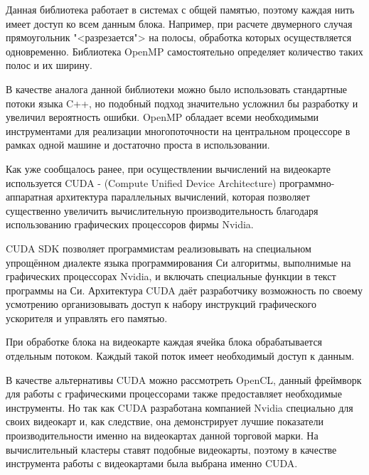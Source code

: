 \documentclass[a4paper, 14pt]{article}
\theoremstyle{definition}
\begin{document}
\par Данная библиотека работает в системах с общей памятью, поэтому каждая нить имеет доступ ко всем данным блока. Например, при расчете двумерного случая прямоугольник "<разрезается"> на полосы, обработка которых осуществляется одновременно. Библиотека OpenMP самостоятельно определяет количество таких полос и их ширину.

\par В качестве аналога данной библиотеки можно было использовать стандартные потоки языка C++, но подобный подход значительно усложнил бы разработку и увеличил вероятность ошибки. OpenMP обладает всеми необходимыми инструментами для реализации многопоточности на центральном процессоре в рамках одной машине и достаточно проста в использовании.


\par Как уже сообщалось ранее, при осуществлении вычислений на видеокарте используется CUDA - (Compute Unified Device Architecture) программно-аппаратная архитектура параллельных вычислений, которая позволяет существенно увеличить вычислительную производительность благодаря использованию графических процессоров фирмы Nvidia.

\par CUDA SDK позволяет программистам реализовывать на специальном упрощённом диалекте языка программирования Си алгоритмы, выполнимые на графических процессорах Nvidia, и включать специальные функции в текст программы на Си. Архитектура CUDA даёт разработчику возможность по своему усмотрению организовывать доступ к набору инструкций графического ускорителя и управлять его памятью.

\par При обработке блока на видеокарте каждая ячейка блока обрабатывается отдельным потоком. Каждый такой поток имеет необходимый доступ к данным.

\par В качестве альтернативы CUDA можно рассмотреть OpenCL, данный фреймворк для работы с графическими процессорами также предоставляет необходимые инструменты. Но так как CUDA разработана компанией Nvidia специально для своих видеокарт и, как следствие, она демонстрирует лучшие показатели производительности именно на видеокартах данной торговой марки. На вычислительный кластеры ставят подобные видеокарты, поэтому в качестве инструмента работы с видеокартами была выбрана именно CUDA.
\end{document}
